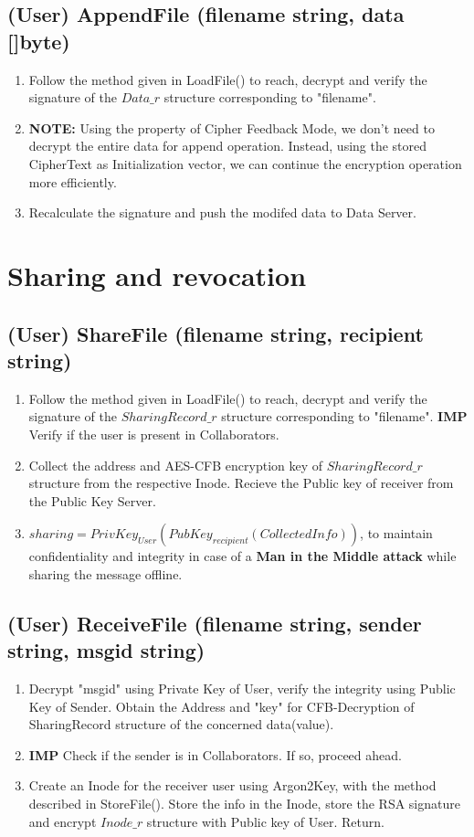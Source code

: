 \documentclass[a4paper, 12pt]{scrartcl}
\begin{document}
\subsection{(User) AppendFile (filename string, data []byte)}
\begin{enumerate}
	\itemsep0em
	\item Follow the method given in LoadFile() to reach, decrypt and verify the signature of the $Data\_r$ structure corresponding to "filename". 
	\item \textbf{NOTE:} Using the property of Cipher Feedback Mode, we don't need to decrypt the entire data for append operation. Instead, using the stored CipherText as Initialization vector, we can continue the encryption operation more efficiently.
	\item Recalculate the signature and push the modifed data to Data Server.
\end{enumerate}

\section{Sharing and revocation}

\subsection{(User) ShareFile (filename string, recipient string)}
\begin{enumerate}
	\itemsep0em
	\item Follow the method given in LoadFile() to reach, decrypt and verify the signature of the $SharingRecord\_r$ structure corresponding to "filename". \textbf{IMP} Verify if the user is present in Collaborators.
	\item Collect the address and AES-CFB encryption key of $SharingRecord\_r$ structure from the respective Inode. Recieve the Public key of receiver from the Public Key Server.
	\item $sharing = PrivKey_{User}(PubKey_{recipient}(Collected Info))$, to maintain confidentiality and integrity in case of a \textbf{Man in the Middle attack} while sharing the message offline.
\end{enumerate}

\subsection{(User) ReceiveFile (filename string, sender string, msgid string)}
\begin{enumerate}
	\itemsep0em
	\item Decrypt "msgid" using Private Key of User, verify the integrity using Public Key of Sender. Obtain the Address and "key" for CFB-Decryption of SharingRecord structure of the concerned data(value).
	\item \textbf{IMP} Check if the sender is in Collaborators. If so, proceed ahead.
	\item Create an Inode for the receiver user using Argon2Key, with the method described in StoreFile(). Store the info in the Inode, store the RSA signature and encrypt $Inode\_r$ structure with Public key of User. Return.
\end{enumerate}
\end{document}
